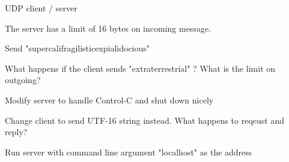 
UDP client / server

The server has a limit of 16 bytes on incoming message.

Send "supercalifragilisticexpialidocious"

What happens if the client sends "extraterrestrial" ?
What is the limit on outgoing?

Modify server to handle Control-C and shut down nicely

Change client to send UTF-16 string instead. What happens to reqeust and reply?

Run server with command line argument "localhost" as the address
